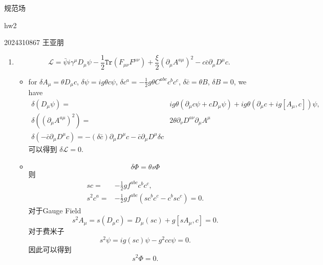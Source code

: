 \documentclass{article}
\begin{document}
\begin{flushright}
    规范场
    
    hw2

    2024310867 王亚朋
\end{flushright}
\begin{enumerate}
    \item \begin{equation}
      \mathcal{L}=\bar{\psi}i\gamma^\mu D_\mu\psi -\frac{1}{2}\mathtt{Tr}(F_{\mu\nu}F^{\mu\nu})+\frac{\xi}{2}(\partial_\mu A^{a\mu})^2-c\bar{c}\partial_\mu D^\mu c.
    \end{equation}
    \begin{itemize}
      \item [a.] for $\delta A_\mu=\theta D_\mu c$, $\delta \psi=ig\theta c \psi$, $\delta c^a=-\frac{1}{2}g\theta C^{abc} c^b c^c$, $\delta \bar{c}=\theta B$, $\delta B=0$, we have
      \begin{equation}
        \begin{aligned}
          \delta\left(D_\mu\psi\right)=&ig\theta\left(\partial_\mu c \psi+cD_\mu\psi\right)+ig\theta(\partial_\mu c+ ig[A_\mu, c])\psi,\\
          \delta\left((\partial_\mu A^{a\mu})^2\right)=&2\theta\partial_\nu D^{a\nu}\partial_\mu A^{\mu}\\                       
          \delta\left(-\bar{c}\partial_\mu D^\mu c\right)=-\left(\delta\bar{c}\right)\partial_\mu D^\mu c-\bar{c}\partial_\mu D^\mu \delta c
        \end{aligned}
      \end{equation}
        可以得到 $\delta\mathcal{L}=0.$
        \item [b.]
        \begin{equation}
          \delta\Phi=\theta s\Phi
        \end{equation}
        则
        \begin{equation}
          \begin{aligned}
            sc=&-\frac{1}{2}gf^{abc}c^bc^c,\\
            s^2c^a=&-\frac{1}{2}gf^{abc}\left(sc^bc^c-c^bsc^c\right)=0.
          \end{aligned}
        \end{equation}
        对于Gauge Field 
        \begin{equation}
          s^2A_\mu=s(D_\mu c)=D_\mu(sc)+g\left[sA_\mu,c\right]=0.
        \end{equation}
        对于费米子
        \begin{equation}
          s^2\psi=ig(sc)\psi-g^2cc\psi=0.
        \end{equation}
        因此可以得到
        \begin{equation}
          s^2\Phi=0.
        \end{equation}
    \end{itemize}
\end{enumerate}
\end{document}
